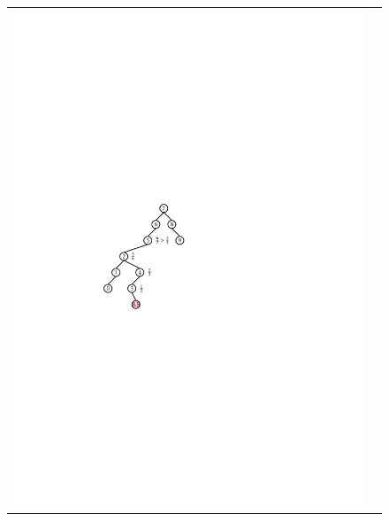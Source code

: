 \begin{figure}
  \begin{center}
    \begin{tabular}{cc}
      \includegraphics[scale=0.90909]{figs/scapegoat-insert-3} &

\end{tabular}
\end{center}
\end{figure}
